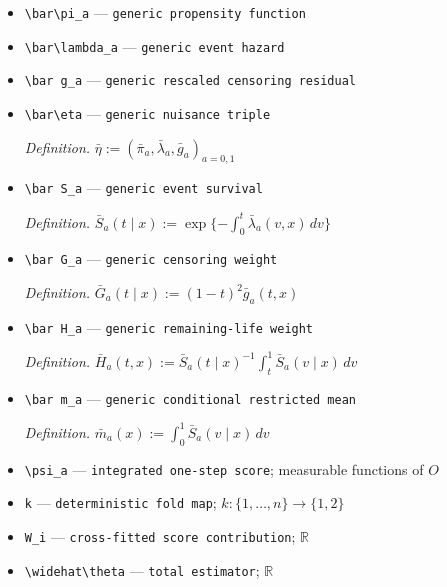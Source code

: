 \documentclass{article}
\begin{document}
\begin{itemize}
  \item \texttt{\textbackslash{}\allowbreak{}bar\textbackslash{}\allowbreak{}pi\_\allowbreak{}a} --- \texttt{generic propensity function}
  \item \texttt{\textbackslash{}\allowbreak{}bar\textbackslash{}\allowbreak{}lambda\_\allowbreak{}a} --- \texttt{generic event hazard}
  \item \texttt{\textbackslash{}\allowbreak{}bar g\_\allowbreak{}a} --- \texttt{generic rescaled censoring residual}
  \item \texttt{\textbackslash{}\allowbreak{}bar\textbackslash{}\allowbreak{}eta} --- \texttt{generic nuisance triple}
  \par\smallskip\noindent\emph{Definition.} \(\bar\eta:=(\bar\pi_a,\bar\lambda_a,\bar g_a)_{a=0,1}\)
  \item \texttt{\textbackslash{}\allowbreak{}bar S\_\allowbreak{}a} --- \texttt{generic event survival}
  \par\smallskip\noindent\emph{Definition.} \(\bar S_a(t\mid x):=\exp\{-\int_0^t\bar\lambda_a(v,x)\,dv\}\)
  \item \texttt{\textbackslash{}\allowbreak{}bar G\_\allowbreak{}a} --- \texttt{generic censoring weight}
  \par\smallskip\noindent\emph{Definition.} \(\bar G_a(t\mid x):=(1-t)^2\bar g_a(t,x)\)
  \item \texttt{\textbackslash{}\allowbreak{}bar H\_\allowbreak{}a} --- \texttt{generic remaining-\allowbreak{}life weight}
  \par\smallskip\noindent\emph{Definition.} \(\bar H_a(t,x):=\bar S_a(t\mid x)^{-1}\int_t^1\bar S_a(v\mid x)\,dv\)
  \item \texttt{\textbackslash{}\allowbreak{}bar m\_\allowbreak{}a} --- \texttt{generic conditional restricted mean}
  \par\smallskip\noindent\emph{Definition.} \(\bar m_a(x):=\int_0^1\bar S_a(v\mid x)\,dv\)
  \item \texttt{\textbackslash{}\allowbreak{}psi\_\allowbreak{}a} --- \texttt{integrated one-\allowbreak{}step score}; measurable functions of \(O\)
  \item \texttt{k} --- \texttt{deterministic fold map}; \(k:\{1,\ldots,n\}\to\{1,2\}\)
  \item \texttt{W\_\allowbreak{}i} --- \texttt{cross-\allowbreak{}fitted score contribution}; \(\mathbb R\)
  \item \texttt{\textbackslash{}\allowbreak{}widehat\textbackslash{}\allowbreak{}theta} --- \texttt{total estimator}; \(\mathbb R\)

\end{itemize}
\end{document}
